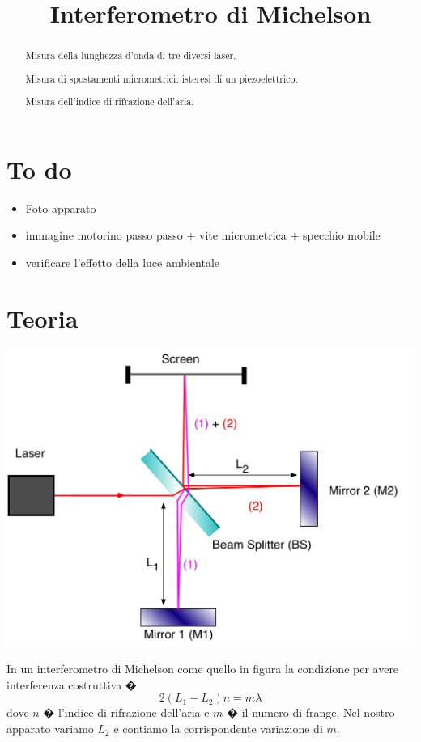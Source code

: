 \documentclass[a4paper]{article}
\begin{document}
	\title{Interferometro di Michelson}
	\maketitle
	
	\section*{To do}
	\begin{itemize}
		\item Foto apparato
		\item immagine motorino passo passo + vite micrometrica + specchio mobile
		\item verificare l'effetto della luce ambientale
	\end{itemize}
	
	
	\begin{abstract}
		 Misura della lunghezza d'onda di tre diversi laser.
		 
		 Misura di spostamenti micrometrici: isteresi di un piezoelettrico.
		 
		 Misura dell'indice di rifrazione dell'aria.
	\end{abstract}

\section{Teoria}
\begin{center}
	\begin{minipage}[c]{.50\textwidth}
		\centering
		\includegraphics[width=1\textwidth]{teoria_michelson.png}
	\end{minipage}
	\begin{minipage}[c]{.40\textwidth}
		In un interferometro di Michelson come quello in figura la condizione per avere interferenza costruttiva � \[2(L_1 -L_2)n = m \lambda\] dove $n$ � l'indice di rifrazione dell'aria e $m$ � il numero di frange. Nel nostro apparato variamo $L_2$ e contiamo la corrispondente variazione di $m$.
	\end{minipage}
\end{center}
\end{document}
